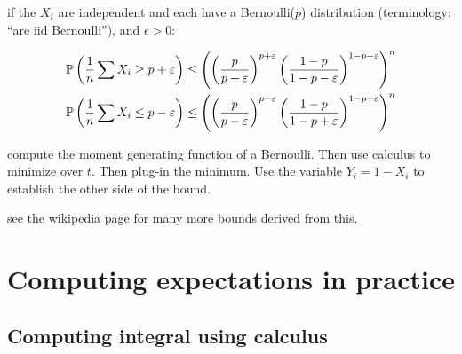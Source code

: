 \documentclass{article}
\begin{document}
 if the $X_i$ are independent and each have a Bernoulli($p$) distribution (terminology: ``are iid Bernoulli''), and $\epsilon > 0$:

\begin{align*}
	\P \left (\frac{1}{n} \sum X_i \geq p + \varepsilon \right ) &\leq \left (\left (\frac{p}{p + \varepsilon}\right )^{p+\varepsilon} {\left (\frac{1 - p}{1-p- \varepsilon}\right )}^{1 - p- \varepsilon}\right )^n  \\
	\P \left (\frac{1}{n} \sum X_i \leq p - \varepsilon \right ) &\leq \left (\left (\frac{p}{p - \varepsilon}\right )^{p-\varepsilon} {\left (\frac{1 - p}{1-p+ \varepsilon}\right )}^{1 - p+ \varepsilon}\right )^n 
\end{align*}

 compute the moment generating function of a Bernoulli. Then use calculus to minimize over $t$. Then plug-in the minimum. Use the variable $Y_i = 1 - X_i$ to establish the other side of the bound.

 see the wikipedia page for many more bounds derived from this.  


\section{Computing expectations in practice}


% 
% 
% 

\subsection{Computing integral using calculus}\label{sec:calculus}
\end{document}
